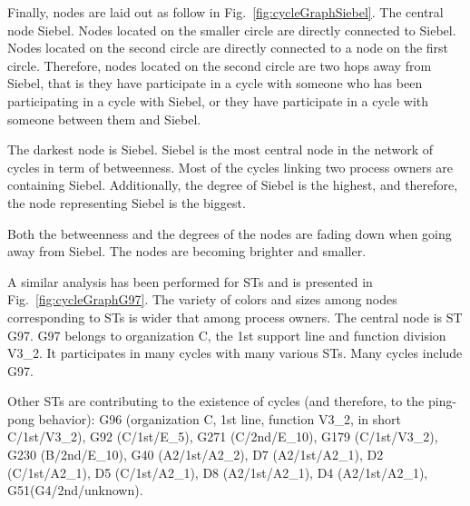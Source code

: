 \documentclass[lnbip]{svmultln}
\begin{document}
Finally, nodes are laid out as follow in Fig.~\ref{fig:cycleGraphSiebel}. The central node Siebel. Nodes located on the smaller circle are directly connected to Siebel. Nodes located on the second circle are directly connected to a node on the first circle. Therefore, nodes located on the second circle are two hops away from Siebel, that is they have participate in a cycle with someone who has been participating in a cycle with Siebel, or they have participate in a cycle with someone between them and Siebel.

The darkest node is Siebel. Siebel is the most central node in the network of cycles in term of betweenness. Most of the cycles linking two process owners are containing Siebel. Additionally, the degree of Siebel is the highest, and therefore, the node representing Siebel is the biggest. 

Both the betweenness and the degrees of the nodes are fading down when going away from Siebel. The nodes are becoming brighter and smaller. 
 
A similar analysis has been performed for STs and is presented in Fig.~\ref{fig:cycleGraphG97}. The variety of colors and sizes among nodes corresponding to STs is wider that among process owners. The central node is ST G97. G97 belongs to organization C, the 1st support line and function division V3\_2. It participates in many cycles with many various STs. Many cycles include G97. 

Other STs are contributing to the existence of cycles (and therefore, to the ping-pong behavior): G96 (organization C, 1st line, function V3\_2, in short C/1st/V3\_2), G92 (C/1st/E\_5), G271 (C/2nd/E\_10), G179 (C/1st/V3\_2), G230 (B/2nd/E\_10), G40 (A2/1st/A2\_2), D7 (A2/1st/A2\_1), D2 (C/1st/A2\_1), D5 (C/1st/A2\_1), D8 (A2/1st/A2\_1), D4 (A2/1st/A2\_1), G51(G4/2nd/unknown).
 
\end{document}
